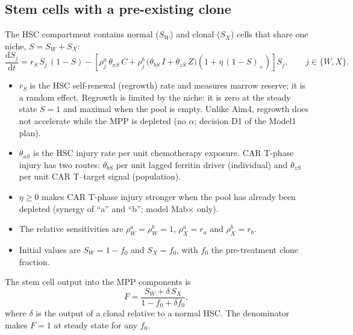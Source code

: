 \documentclass[11pt]{article}
\newcommand{\dd}{\mathrm{d}}
\newcommand{\pos}[1]{\left(#1\right)_{+}}
\begin{document}
\subsection{Stem cells with a pre-existing clone}
The HSC compartment contains normal ($S_W$) and clonal ($S_X$) cells that share one niche, $S=S_W+S_X$:
\begin{equation}
\frac{\dd S_j}{\dd t} = r_S\,S_j\,(1-S) - \left[\rho^a_j\,\theta_{aS}\,C + \rho^b_j\,\bigl(\theta_{bS}\,I+\theta_{zS}\,Z\bigr)\left(1+\eta\,\pos{1-S}\right)\right] S_j,\qquad j\in\{W,X\}.
\label{eq:hsc}
\end{equation}
\begin{itemize}
\item $r_S$ is the HSC self-renewal (regrowth) rate and measures marrow reserve; it is a random effect. Regrowth is limited by the niche: it is zero at the steady state $S=1$ and maximal when the pool is empty. Unlike Aim4, regrowth does not accelerate while the MPP is depleted (no $\alpha$; decision D1 of the Model1 plan).
\item $\theta_{aS}$ is the HSC injury rate per unit chemotherapy exposure. CAR T-phase injury has two routes: $\theta_{bS}$ per unit lagged ferritin driver (individual) and $\theta_{zS}$ per unit CAR T--target signal (population).
\item $\eta\geq0$ makes CAR T-phase injury stronger when the pool has already been depleted (synergy of ``a'' and ``b''; model Mab$\times$ only).
\item The relative sensitivities are $\rho^a_W=\rho^b_W=1$, $\rho^a_X=r_a$ and $\rho^b_X=r_b$.
\item Initial values are $S_W=1-f_0$ and $S_X=f_0$, with $f_0$ the pre-treatment clone fraction.
\end{itemize}
The stem cell output into the MPP components is
\begin{equation}
F = \frac{S_W + \delta\,S_X}{1-f_0+\delta f_0}, \label{eq:F}
\end{equation}
where $\delta$ is the output of a clonal relative to a normal HSC. The denominator makes $F=1$ at steady state for any $f_0$.
\end{document}
